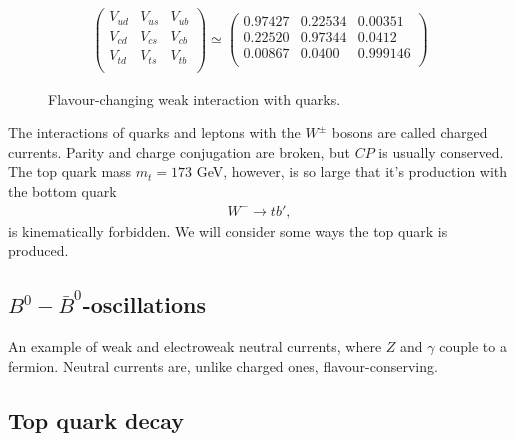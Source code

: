 \documentclass[11pt]{article}
\begin{document}
\begin{multicols}{2}
\begin{flushleft}
\begin{align*}
\begin{pmatrix}
V_{ud} & V_{us} & V_{ub}\\
V_{cd} & V_{cs} & V_{cb}\\
V_{td} & V_{ts} & V_{tb}\\
\end{pmatrix}
\simeq \begin{pmatrix}
0.97427 & 0.22534 & 0.00351 \\
0.22520 & 0.97344 & 0.0412 \\
0.00867 & 0.0400 & 0.999146\\
\end{pmatrix}
\end{align*}
\begin{figure}[H]
\centering
\label{fig:: flavour change}
\caption{Flavour-changing weak interaction with quarks.}
\end{figure}
The interactions of quarks and leptons with the $W^{\pm}$ bosons are called charged currents. Parity and charge conjugation are broken, but $CP$ is usually conserved. The top quark mass $m_t = 173$ GeV, however, is so large that it's production with the bottom quark
\begin{align*}
W^- \rightarrow t b',
\end{align*}
is kinematically forbidden. We will consider some ways the top quark is produced.
\end{flushleft}

\subsection*{$B^0-\bar{B}^0$-oscillations}
\begin{flushleft}
An example of weak and electroweak neutral currents, where $Z$ and $\gamma$ couple to a fermion. Neutral currents are, unlike charged ones, flavour-conserving. 
\end{flushleft}


\subsection*{Top quark decay}


\end{multicols}
\end{document}

